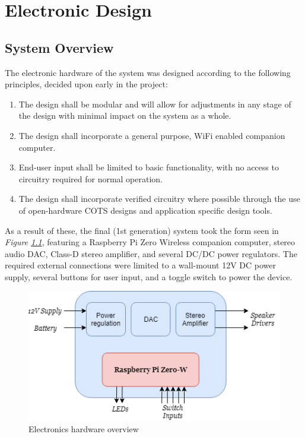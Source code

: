 \documentclass[main.tex]{subfiles}
\begin{document}
\chapter{Electronic Design}
\section{System Overview}

The electronic hardware of the system was designed according to the following principles, decided upon early in the project:
\begin{enumerate}
    \item The design shall be modular and will allow for adjustments in any stage of the design with minimal impact on the system as a whole.
    \item The design shall incorporate a general purpose, WiFi enabled companion computer.
    \item End-user input shall be limited to basic functionality, with no access to circuitry required for normal operation.
    \item The design shall incorporate verified circuitry where possible through the use of open-hardware COTS designs and application specific design tools.
\end{enumerate}
As a result of these, the final (1st generation) system took the form seen in \textit{Figure \ref{fig:electronics-system}}, featuring a Raspberry Pi Zero Wireless companion computer, stereo audio DAC, Class-D stereo amplifier, and several DC/DC power regulators. The required external connections were limited to a wall-mount 12V DC power supply, several buttons for user input, and a toggle switch to power the device.

\begin{figure}[H]
    \centering
    \includegraphics[scale=0.75]{./figs/electronics-system.png}        
    \caption{Electronics hardware overview}
    \label{fig:electronics-system}
\end{figure}
\end{document}
